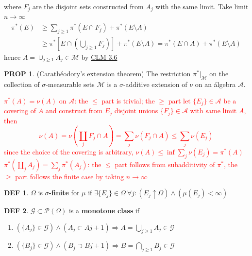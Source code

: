 \documentclass[hidelinks]{article}
\theoremstyle{definition}
\newtheorem*{defin}{DEF}
\theoremstyle{dotless}
\newtheorem{proposition}{PROP}[section]
\theoremstyle{remark}
\begin{document}
{\begin{enumerate}[label=\arabic*\degree]
\begin{equation*}
    \end{equation*}
    where $F_j$ are the disjoint sets constructed from $A_j$ with the same limit.\newline
    Take limit $n\to\infty$
    \begin{equation*}
    \begin{split}
        \pi^*(E)&\geq\sum_{j\geq1}\pi^*(E\cap F_j)+\pi^*(E\setminus A)\\
        &\geq\pi^*[E\cap(\bigcup_{j\geq1}F_j)]+\pi^*(E\setminus A)=\pi^*(E\cap A)+\pi^*(E\setminus A)
    \end{split}
    \end{equation*}
    hence $A=\cup_{j\geq1}A_j\in\mathscr{M}$ by \hyperref[CLM 3.6]{CLM 3.6}
\end{enumerate}}

\begin{proposition}(Carathéodory's extension theorem) The restriction $\pi^*|_\mathscr{M}$ on the collection of $\sigma$-measurable sets $\mathscr{M}$ is a $\sigma$-additive extension of $\nu$ on an álgebra $\mathscr{A}$.
\end{proposition}
\textcolor{red}{$\pi^*(A)=\nu(A)$ on $\mathscr{A}$:\newline
the $\leq$ part is trivial; the $\geq$ part let $\{E_j\}\in\mathscr{A}$ be a covering of $A$ and construct from $E_j$ disjoint unions $\{F_j\}\in\mathscr{A}$ with same limit $A$, then
\[\nu(A)=\nu(\coprod_jF_j\cap A)=\sum_j\nu(F_j\cap A)\leq\sum_j\nu(E_j)\]
since the choice of the covering is arbitrary, $\nu(A)\leq\inf\sum\limits_j\nu(E_j)=\pi^*(A)$\newline
$\pi^*(\coprod\limits_jA_j)=\sum\limits_j\pi^*(A_j)$:\newline
the $\leq$ part follows from subadditivity of $\pi^*$, the $\geq$ part follows the finite case by taking $n\to\infty$}

\begin{defin}
$\Omega$ is \textbf{$\sigma$-finite} for $\mu$ if $\exists \{E_j\}\in\Omega\ \forall j:(E_j\uparrow\Omega)\wedge(\mu(E_j)<\infty)$
\end{defin}

\begin{defin}
$\mathscr{G}\subset\mathscr{P}(\Omega)$ is a \textbf{monotone class} if
\begin{enumerate}[label=\arabic*\degree]
    \item $(\{A_j\}\in\mathscr{G})\wedge(A_j\subset A{j+1})\Rightarrow A=\bigcup\limits_{j\geq1}A_j\in\mathscr{G}$
    \item $(\{B_j\}\in\mathscr{G})\wedge(B_j\supset B{j+1})\Rightarrow B=\bigcap\limits_{j\geq1}B_j\in\mathscr{G}$
\end{enumerate}
\end{defin}
\end{document}
